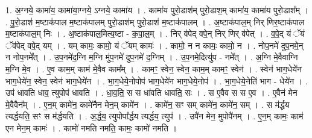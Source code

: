 \documentclass[17pt]{extarticle}
\begin{document}
1. अ॒ग्नये॒ कामा॑य॒ कामा॑या॒ग्नये॒ ऽग्नये॒ कामा॑य । . कामा॑य पुरो॒डाश॑म् पुरो॒डाश॒म् कामा॑य॒ कामा॑य पुरो॒डाश᳚म् । . पु॒रो॒डाश॑ म॒ष्टाक॑पाल म॒ष्टाक॑पालम् पुरो॒डाश॑म् पुरो॒डाश॑ म॒ष्टाक॑पालम् । . अ॒ष्टाक॑पाल॒म् निर् णिर॒ष्टाक॑पाल म॒ष्टाक॑पाल॒म् निः । . अ॒ष्टाक॑पाल॒मित्य॒ष्टा - क॒पा॒ल॒म् । . निर् व॑पेद् वपे॒न् निर् णिर् व॑पेत् । . व॒पे॒द् यं ॅयं ॅव॑पेद् वपे॒द् यम् । . यम् कामः॒ कामो॒ यं ॅयम् कामः॑ । . कामो॒ न न कामः॒ कामो॒ न । . नोप॒नमे॑ दुप॒नमे॒न् न नोप॒नमे᳚त् । . उ॒प॒नमे॑द॒ग्नि म॒ग्नि मु॑प॒नमे॑ दुप॒नमे॑ द॒ग्निम् । . उ॒प॒नमे॒दित्यु॑प - नमे᳚त् । . अ॒ग्नि मे॒वैवाग्नि म॒ग्नि मे॒व । . ए॒व काम॒म् काम॑ मे॒वैव काम᳚म् । . कामꣳ॒॒ स्वेन॒ स्वेन॒ काम॒म् कामꣳ॒॒ स्वेन॑ । . स्वेन॑ भाग॒धेये॑न भाग॒धेये॑न॒ स्वेन॒ स्वेन॑ भाग॒धेये॑न । . भा॒ग॒धेये॒नोपोप॑ भाग॒धेये॑न भाग॒धेये॒नोप॑ । . भा॒ग॒धेये॒नेति॑ भाग - धेये॑न । . उप॑ धावति धाव॒ त्युपोप॑ धावति । . धा॒व॒ति॒ स स धा॑वति धावति॒ सः । . स ए॒वैव स स ए॒व । . ए॒वैन॑ मेन मे॒वैवैन᳚म् । . ए॒न॒म् कामे॑न॒ कामे॑नैन मेन॒म् कामे॑न । . कामे॑न॒ सꣳ सम् कामे॑न॒ कामे॑न॒ सम् । . स म॑र्द्धय त्यर्द्धयति॒ सꣳ स म॑र्द्धयति । . अ॒र्द्ध॒य॒ त्युपोपा᳚र्द्धय त्यर्द्धय॒ त्युप॑ । . उपै॑न मेन॒ मुपोपै॑नम् । . ए॒न॒म् कामः॒ काम॑ एन मेन॒म् कामः॑ । . कामो॑ नमति नमति॒ कामः॒ कामो॑ नमति । \newline
\end{document}
